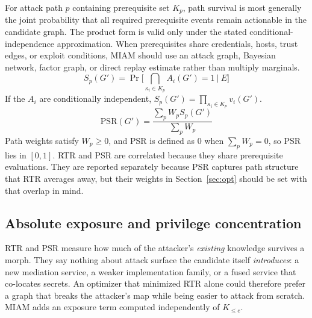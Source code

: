 \documentclass[11pt,letterpaper]{article}
\begin{document}
For attack path $p$ containing prerequisite set $K_p$, path survival is most generally the joint probability that all required prerequisite events remain actionable in the candidate graph. The product form is valid only under the stated conditional-independence approximation. When prerequisites share credentials, hosts, trust edges, or exploit conditions, MIAM should use an attack graph, Bayesian network, factor graph, or direct replay estimate rather than multiply marginals.
\begin{equation}
S_p(G')=\Pr\Big[\textstyle\bigcap_{\kappa_i\in K_p}A_i(G')=1\ \Big|\ E\Big]
\end{equation}
If the $A_i$ are conditionally independent, $S_p(G')=\prod_{\kappa_i\in K_p}v_i(G')$.
\begin{equation}
\mathrm{PSR}(G')=\frac{\sum_p W_pS_p(G')}{\sum_pW_p}
\end{equation}
Path weights satisfy $W_p\ge0$, and PSR is defined as 0 when $\sum_pW_p=0$, so PSR lies in $[0,1]$. RTR and PSR are correlated because they share prerequisite evaluations. They are reported separately because PSR captures path structure that RTR averages away, but their weights in Section~\ref{sec:opt} should be set with that overlap in mind.

\subsection{Absolute exposure and privilege concentration}\label{sec:exposure}

RTR and PSR measure how much of the attacker's \emph{existing} knowledge survives a morph. They say nothing about attack surface the candidate itself \emph{introduces}: a new mediation service, a weaker implementation family, or a fused service that co-locates secrets. An optimizer that minimized RTR alone could therefore prefer a graph that breaks the attacker's map while being easier to attack from scratch. MIAM adds an exposure term computed independently of $K_{\le e}$.
\end{document}
